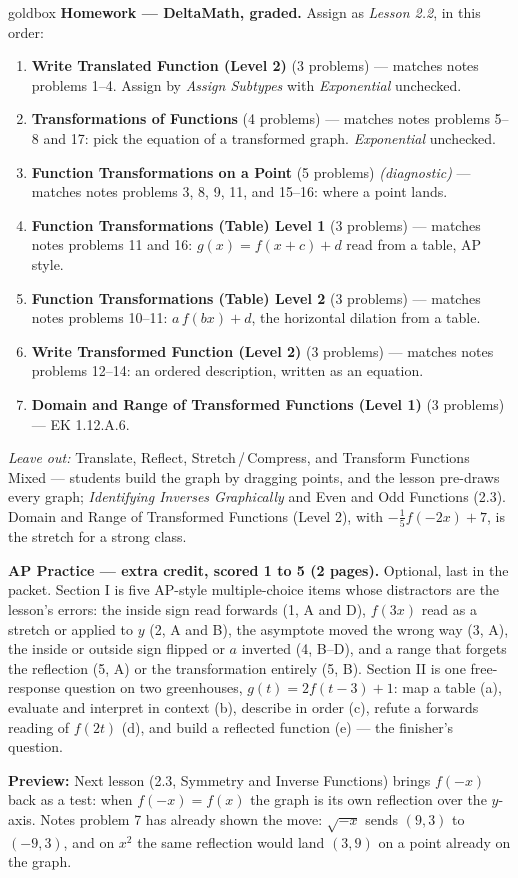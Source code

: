 \documentclass[10pt]{article}
\begin{document}
\begin{skillbox}{goldbox}
\textbf{Homework --- DeltaMath, graded.} Assign as \textit{Lesson 2.2}, in this order:
\begin{enumerate}[itemsep=1pt,topsep=2pt]
  \item \textbf{Write Translated Function (Level 2)} (3 problems) --- matches notes problems
        1--4. Assign by \textit{Assign Subtypes} with \textit{Exponential} unchecked.
  \item \textbf{Transformations of Functions} (4 problems) --- matches notes problems 5--8 and
        17: pick the equation of a transformed graph. \textit{Exponential} unchecked.
  \item \textbf{Function Transformations on a Point} (5 problems) \textit{(diagnostic)} ---
        matches notes problems 3, 8, 9, 11, and 15--16: where a point lands.
  \item \textbf{Function Transformations (Table) Level 1} (3 problems) --- matches notes
        problems 11 and 16: $g(x) = f(x + c) + d$ read from a table, AP style.
  \item \textbf{Function Transformations (Table) Level 2} (3 problems) --- matches notes
        problems 10--11: $a\,f(bx) + d$, the horizontal dilation from a table.
  \item \textbf{Write Transformed Function (Level 2)} (3 problems) --- matches notes problems
        12--14: an ordered description, written as an equation.
  \item \textbf{Domain and Range of Transformed Functions (Level 1)} (3 problems) --- EK
        1.12.A.6.
\end{enumerate}
\textit{Leave out:} Translate, Reflect, Stretch\,/\,Compress, and Transform Functions Mixed ---
students build the graph by dragging points, and the lesson pre-draws every graph;
\textit{Identifying Inverses Graphically} and Even and Odd Functions (2.3). Domain and Range of
Transformed Functions (Level 2), with $-\tfrac15 f(-2x) + 7$, is the stretch for a strong class.

\textbf{AP Practice --- extra credit, scored 1 to 5 (2 pages).} Optional, last in the packet.
Section I is five AP-style multiple-choice items whose distractors are the lesson's errors: the
inside sign read forwards (1, A and D), $f(3x)$ read as a stretch or applied to $y$ (2, A and B),
the asymptote moved the wrong way (3, A), the inside or outside sign flipped or $a$ inverted
(4, B--D), and a range that forgets the reflection (5, A) or the transformation entirely (5, B).
Section II is one free-response question on two greenhouses, $g(t) = 2f(t - 3) + 1$: map a
table (a), evaluate and interpret in context (b), describe in order (c), refute a forwards
reading of $f(2t)$ (d), and build a reflected function (e) --- the finisher's question.

\textbf{Preview:} Next lesson (2.3, Symmetry and Inverse Functions) brings $f(-x)$ back as a
test: when $f(-x) = f(x)$ the graph is its own reflection over the $y$-axis. Notes problem 7
has already shown the move: $\sqrt{-x}$ sends $(9, 3)$ to $(-9, 3)$, and on $x^2$ the same
reflection would land $(3, 9)$ on a point already on the graph.
\end{skillbox}
\end{document}
